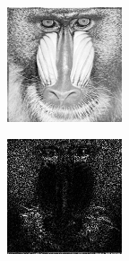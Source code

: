\begin{figure}
\centering
        \begin{subfigure}{0.4\textwidth}\centering
                    \includegraphics[width=\linewidth]{figures/mandrill1.png}
       \end{subfigure}%
        \begin{subfigure}{0.4\textwidth}\centering
                    \includegraphics[width=\linewidth]{figures/mandrill2.png}

\end{subfigure}
\end{figure}
